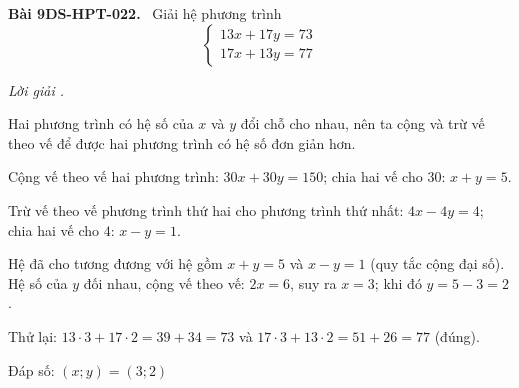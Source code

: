 \documentclass[12pt,a4paper]{article}
\newenvironment{problem}[1][]{\par\medskip\noindent\textbf{Bài #1.}\ }{\par}
\newenvironment{solution}[1][]{\par\noindent\textit{Lời giải #1.}\par}{\par}
\begin{document}
\begin{problem}[9DS-HPT-022]
Giải hệ phương trình
\[ \begin{cases} 13x + 17y = 73 \\ 17x + 13y = 77 \end{cases} \]

\begin{solution}
Hai phương trình có hệ số của $x$ và $y$ đổi chỗ cho nhau, nên ta cộng và trừ vế theo vế để được hai phương trình có hệ số đơn giản hơn.

Cộng vế theo vế hai phương trình: $30x + 30y = 150$; chia hai vế cho $30$: $x + y = 5$.

Trừ vế theo vế phương trình thứ hai cho phương trình thứ nhất: $4x - 4y = 4$; chia hai vế cho $4$: $x - y = 1$.

Hệ đã cho tương đương với hệ gồm $x + y = 5$ và $x - y = 1$ (quy tắc cộng đại số). Hệ số của $y$ đối nhau, cộng vế theo vế: $2x = 6$, suy ra $x = 3$; khi đó $y = 5 - 3 = 2$.

Thử lại: $13 \cdot 3 + 17 \cdot 2 = 39 + 34 = 73$ và $17 \cdot 3 + 13 \cdot 2 = 51 + 26 = 77$ (đúng).

Đáp số: $\boxed{(x; y) = (3; 2)}$
\end{solution}
\end{problem}
\end{document}
